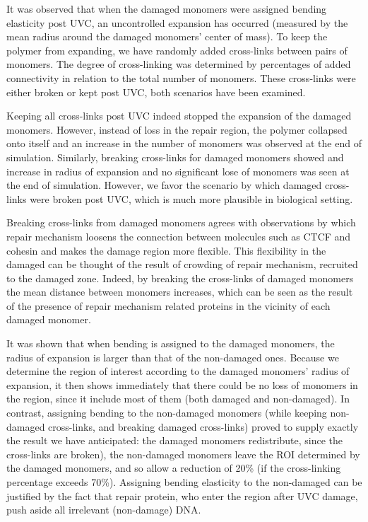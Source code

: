 \documentclass[12pt]{report}
\begin{document}
	 It was observed that when the damaged monomers were assigned bending elasticity post UVC, an uncontrolled expansion has occurred (measured by the mean radius around the damaged monomers' center of mass). To keep the polymer from expanding, we have randomly added cross-links between pairs of monomers. The degree of cross-linking was determined by percentages of added connectivity in relation to the total number of monomers. These cross-links were either broken or kept post UVC, both scenarios have been examined. 
	 
	 Keeping all cross-links post UVC indeed stopped the expansion of the damaged monomers. However, instead of loss in the repair region, the polymer collapsed onto itself and an increase in the number of monomers was observed at the end of simulation. Similarly, breaking cross-links for damaged monomers showed and increase in radius of expansion and no significant lose of monomers was seen at the end of simulation. However, we favor the scenario by which damaged cross-links were broken post UVC, which is much more plausible in biological setting. 
	 
	 Breaking cross-links from damaged monomers agrees with observations by which repair mechanism loosens the connection between molecules such as CTCF and cohesin and makes the damage region more flexible. This flexibility in the damaged can be thought of the result of crowding of repair mechanism, recruited to the damaged zone. Indeed, by breaking the cross-links of damaged monomers the mean distance between monomers increases, which can be seen as the result of the presence of repair mechanism related proteins in the vicinity of each damaged monomer. 
     
     It was shown that when bending is assigned to the damaged monomers, the radius of expansion is larger than that of the non-damaged ones. Because we determine the region of interest according to the damaged monomers' radius of expansion, it then shows immediately that there could be no loss of monomers in the region, since it include most of them (both damaged and non-damaged). In contrast, assigning bending to the non-damaged monomers (while keeping non-damaged cross-links, and breaking damaged cross-links) proved to supply exactly the result we have anticipated: the damaged monomers redistribute, since the cross-links are broken), the non-damaged monomers leave the ROI determined by the damaged monomers, and so allow a reduction of 20\% (if the cross-linking percentage exceeds 70\%). Assigning bending elasticity to the non-damaged can be justified by the fact that repair protein, who enter the region after UVC damage, push aside all irrelevant (non-damage) DNA.
     
\end{document}
